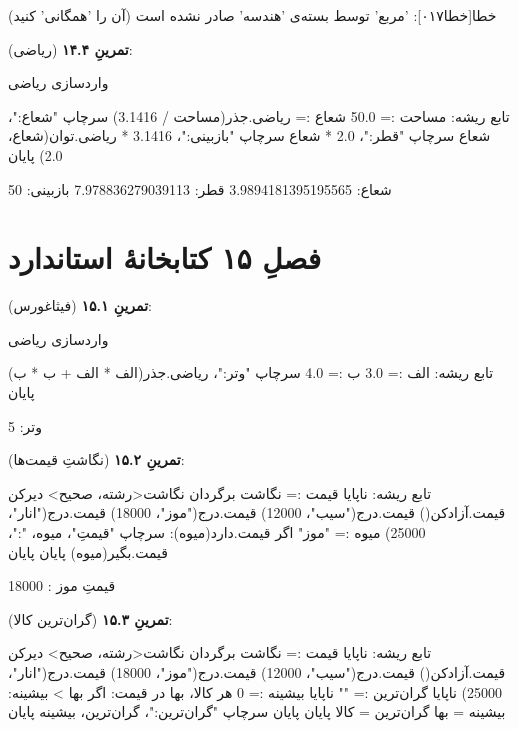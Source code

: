 \begin{progoutfa}
خطا[خطا۰۱۷]: 'مربع' توسط بسته‌ی 'هندسه' صادر نشده است (آن را 'همگانی' کنید)
\end{progoutfa}

\textbf{تمرینِ ۱۴.۴} (ریاضی):
\begin{salamfa}
واردسازی ریاضی

تابع ریشه:
    مساحت := 50.0
    شعاع := ریاضی.جذر(مساحت / 3.1416)
    سرچاپ "شعاع:"، شعاع
    سرچاپ "قطر:"، 2.0 * شعاع
    سرچاپ "بازبینی:"، 3.1416 * ریاضی.توان(شعاع، 2.0)
پایان
\end{salamfa}

\begin{progoutfa}
شعاع: 3.9894181395195565
قطر: 7.978836279039113
بازبینی: 50
\end{progoutfa}

\section*{فصلِ ۱۵ کتابخانهٔ استاندارد}
{}

\textbf{تمرینِ ۱۵.۱} (فیثاغورس):
\begin{salamfa}
واردسازی ریاضی

تابع ریشه:
    الف := 3.0
    ب := 4.0
    سرچاپ "وتر:"، ریاضی.جذر(الف * الف + ب * ب)
پایان
\end{salamfa}

\begin{progoutfa}
وتر: 5
\end{progoutfa}

\textbf{تمرینِ ۱۵.۲} (نگاشتِ قیمت‌ها):
\begin{salamfa}
تابع ریشه:
    ناپایا قیمت := نگاشت {} برگردان نگاشت<رشته، صحیح>
    دیرکن قیمت.آزادکن()
    قیمت.درج("سیب"، 12000)
    قیمت.درج("موز"، 18000)
    قیمت.درج("انار"، 25000)
    میوه := "موز"
    اگر قیمت.دارد(میوه):
        سرچاپ "قیمتِ"، میوه، ":"، قیمت.بگیر(میوه)
    پایان
پایان
\end{salamfa}

\begin{progoutfa}
قیمتِ موز : 18000
\end{progoutfa}

\textbf{تمرینِ ۱۵.۳} (گران‌ترین کالا):
\begin{salamfa}
تابع ریشه:
    ناپایا قیمت := نگاشت {} برگردان نگاشت<رشته، صحیح>
    دیرکن قیمت.آزادکن()
    قیمت.درج("سیب"، 12000)
    قیمت.درج("موز"، 18000)
    قیمت.درج("انار"، 25000)
    ناپایا گران‌ترین := ""
    ناپایا بیشینه := 0
    هر کالا، بها در قیمت:
        اگر بها > بیشینه:
            بیشینه = بها
            گران‌ترین = کالا
        پایان
    پایان
    سرچاپ "گران‌ترین:"، گران‌ترین، بیشینه
پایان
\end{salamfa}

